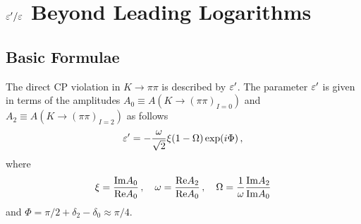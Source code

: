 \section{$\varepsilon'/\varepsilon$ Beyond Leading Logarithms}
        \label{sec:nloepe}
\subsection{Basic Formulae}
           \label{subsec:epeformulae}
The direct CP violation in $K \to \pi\pi$ is described by $\varepsilon'$.
The parameter $\varepsilon'$ is given in terms of the amplitudes $A_0 \equiv
A(K \to (\pi\pi)_{I=0})$ and $A_2 \equiv
A(K \to (\pi\pi)_{I=2})$ as follows
\begin{equation}
\varepsilon' = -\frac{\omega}{\sqrt{2}} \xi (1 - \Omega) \exp(i \Phi) \, ,
\label{eq:epsprim}
\end{equation}
where
\begin{equation}
\xi = \frac{{\rm Im} A_0}{{\rm Re} A_0} \, , \quad
\omega = \frac{{\rm Re} A_2}{{\rm Re} A_0} \, , \quad
\Omega = \frac{1}{\omega} \frac{{\rm Im} A_2}{{\rm Im} A_0}
\label{eq:xiomega}
\end{equation}
and $\Phi = \pi/2 + \delta_2 - \delta_0 \approx \pi/4$.

